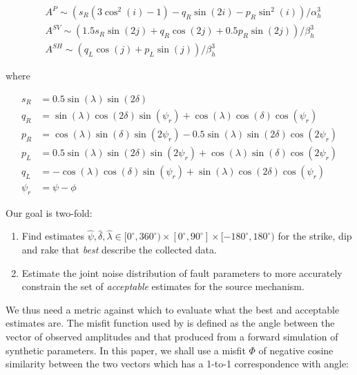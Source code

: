 \documentclass[preprint]{seismica}
\begin{document}
    \begin{align} \label{eq:1}
      \nonumber &A^P \sim \left( s_R(3\cos^2(i) - 1) - q_R\sin(2i) - p_R\sin^2(i)\right)/\alpha_h^3\\
      \nonumber &A^{SV} \sim \left( 1.5 s_R\sin(2j) + q_R\cos(2j) + 0.5 p_R\sin(2j) \right)/\beta_h^3\\
      &A^{SH} \sim \left( q_L\cos(j) + p_L\sin(j) \right)/\beta_h^3
    \end{align}

    where

    \begin{align} \label{eq:2}
      \nonumber s_R &= 0.5 \sin(\lambda) \sin(2\delta)\\
      \nonumber q_R &= \sin(\lambda) \cos(2\delta) \sin(\psi_r) + \cos(\lambda) \cos(\delta) \cos(\psi_r)\\
      \nonumber p_R &= \cos(\lambda) \sin(\delta) \sin(2\psi_r) - 0.5\sin(\lambda) \sin(2\delta) \cos(2\psi_r)\\
      \nonumber p_L &= 0.5\sin(\lambda) \sin(2\delta) \sin(2\psi_r) + \cos(\lambda) \sin(\delta) \cos(2\psi_r)\\
      \nonumber q_L &= -\cos(\lambda) \cos(\delta) \sin(\psi_r) + \sin(\lambda) \cos(2\delta) \cos(\psi_r)\\
      \psi_r &= \psi - \phi
    \end{align}

    Our goal is two-fold:
    \begin{enumerate}
      \item [i)]
        Find estimates $\widehat{\psi}, \widehat{\delta}, \widehat{\lambda} \in [0^\circ,360^\circ) \times 
        [0^\circ,90^\circ] \times [-180^\circ,180^\circ)$ for the strike, dip and rake that \textit{best} describe
        the collected data.

      \item [ii)]
        Estimate the joint noise distribution of fault parameters to more accurately constrain the
        set of \textit{acceptable} estimates for the source mechanism.
        
    \end{enumerate}

    We thus need a metric against which to evaluate what the best and acceptable estimates are. The
    misfit function used by \citet{sita_potential_2022} is defined as the angle between the vector of
    observed amplitudes and that produced from a forward simulation of synthetic parameters.
    In this paper, we shall use a misfit $\Phi$ of negative cosine similarity between the two vectors
    which has a 1-to-1 correspondence with angle:
\end{document}
